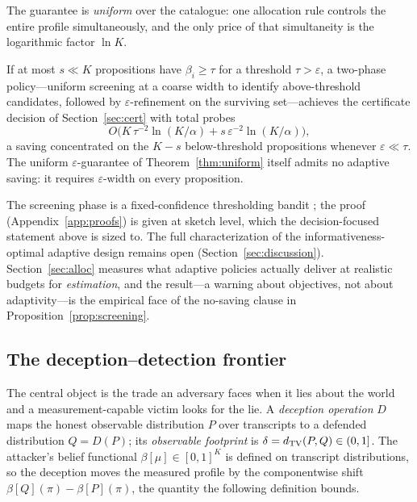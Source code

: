 The guarantee is \emph{uniform} over the catalogue: one allocation rule
controls the entire profile simultaneously, and the only price of that
simultaneity is the logarithmic factor $\ln K$.

\begin{proposition}\label{prop:screening}
If at most $s\ll K$ propositions have $\beta_i\ge\tau$ for a threshold
$\tau>\varepsilon$, a two-phase policy---uniform screening at a coarse
width to identify above-threshold candidates, followed by
$\varepsilon$-refinement on the surviving set---achieves the certificate
decision of Section~\ref{sec:cert} with total probes
\[
O\bigl(K\,\tau^{-2}\ln(K/\alpha)+s\,\varepsilon^{-2}\ln(K/\alpha)\bigr),
\]
a saving concentrated on the $K-s$ below-threshold propositions whenever
$\varepsilon\ll\tau$. The uniform $\varepsilon$-guarantee of
Theorem~\ref{thm:uniform} itself admits no adaptive saving: it requires
$\varepsilon$-width on every proposition.
\end{proposition}

The screening phase is a fixed-confidence thresholding bandit \cite{jamieson2014}; the proof
(Appendix~\ref{app:proofs}) is given at sketch level, which the
decision-focused statement above is sized to. The full characterization of
the informativeness-optimal adaptive design remains open
(Section~\ref{sec:discussion}). Section~\ref{sec:alloc} measures what
adaptive policies actually deliver at realistic budgets for
\emph{estimation}, and the result---a warning about objectives, not about
adaptivity---is the empirical face of the no-saving clause in
Proposition~\ref{prop:screening}.

\subsection{The deception--detection frontier}\label{sec:t5}

The central object is the trade an adversary faces when it lies about the
world and a measurement-capable victim looks for the lie. A \emph{deception
operation} $D$ maps the honest observable distribution $P$ over transcripts
to a defended distribution $Q=D(P)$; its \emph{observable footprint} is
$\delta=d_{\mathrm{TV}}(P,Q)\in(0,1]$. The attacker's belief functional
$\beta[\mu]\in[0,1]^K$ is defined on transcript distributions, so the
deception moves the measured profile by the componentwise shift
$\beta[Q](\pi)-\beta[P](\pi)$, the quantity the following definition
bounds.

